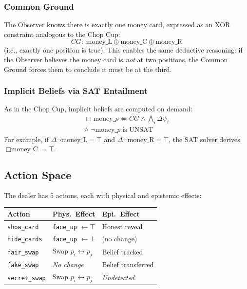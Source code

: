 \documentclass[letterpaper, 10 pt, conference]{ieeeconf}  %
\newcommand{\EBel}[1]{\ensuremath{\Delta #1}} %
\newcommand{\IBel}[1]{\ensuremath{\Box #1}}   %
\newcommand{\CG}{\ensuremath{\mathit{CG}}}    %
\begin{document}
\subsubsection{Common Ground}

The Observer knows there is exactly one money card, expressed as an XOR constraint analogous to the Chop Cup:
\[
    \CG:\; \text{money\_L} \oplus \text{money\_C} \oplus \text{money\_R}
\]
\vspace{-1ex}\noindent(i.e., exactly one position is true).
This enables the same deductive reasoning: if the Observer believes the money card is \emph{not} at two positions, the Common Ground forces them to conclude it must be at the third.

\subsubsection{Implicit Beliefs via SAT Entailment}

As in the Chop Cup, implicit beliefs are computed on demand:
\begin{multline*}
    \IBel{\text{money}\_p} \iff
    \CG \land \bigwedge_i \EBel{\psi_i}\\
    \land\; \neg\text{money}\_p \;\text{is UNSAT}
\end{multline*}
For example, if $\EBel{\neg\text{money\_L}} = \top$ and $\EBel{\neg\text{money\_R}} = \top$, the SAT solver derives $\IBel{\text{money\_C}} = \top$.

\subsection{Action Space}

The dealer has 5 actions, each with physical and epistemic effects:

\begin{center}
\begin{tabular}{lll}
\toprule
\textbf{Action} & \textbf{Phys.\ Effect} & \textbf{Epi.\ Effect} \\
\midrule
\texttt{show\_card} & \texttt{face\_up} $\gets \top$ & Honest reveal \\
\texttt{hide\_cards} & \texttt{face\_up} $\gets \bot$ & (no change) \\
\texttt{fair\_swap} & Swap $p_i \!\leftrightarrow\! p_j$ & Belief tracked \\
\texttt{fake\_swap} & \emph{No change} & Belief transferred \\
\texttt{secret\_swap} & Swap $p_i \!\leftrightarrow\! p_j$ & \emph{Undetected} \\
\bottomrule
\end{tabular}
\end{center}
\end{document}
